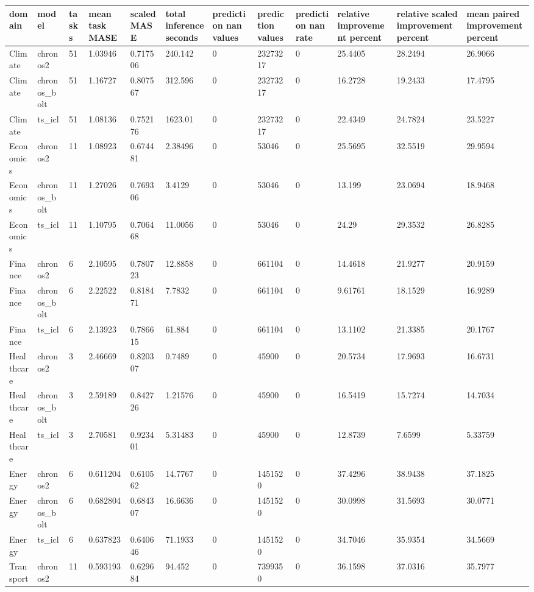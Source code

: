 \begin{tabular}{llllllllllll}
\toprule
domain & model & tasks & mean task MASE & scaled MASE & total inference seconds & prediction nan values & prediction values & prediction nan rate & relative improvement percent & relative scaled improvement percent & mean paired improvement percent \\
\midrule
Climate & chronos2 & 51 & 1.03946 & 0.717506 & 240.142 & 0 & 23273217 & 0 & 25.4405 & 28.2494 & 26.9066 \\
Climate & chronos\_bolt & 51 & 1.16727 & 0.807567 & 312.596 & 0 & 23273217 & 0 & 16.2728 & 19.2433 & 17.4795 \\
Climate & ts\_icl & 51 & 1.08136 & 0.752176 & 1623.01 & 0 & 23273217 & 0 & 22.4349 & 24.7824 & 23.5227 \\
Economics & chronos2 & 11 & 1.08923 & 0.674481 & 2.38496 & 0 & 53046 & 0 & 25.5695 & 32.5519 & 29.9594 \\
Economics & chronos\_bolt & 11 & 1.27026 & 0.769306 & 3.4129 & 0 & 53046 & 0 & 13.199 & 23.0694 & 18.9468 \\
Economics & ts\_icl & 11 & 1.10795 & 0.706468 & 11.0056 & 0 & 53046 & 0 & 24.29 & 29.3532 & 26.8285 \\
Finance & chronos2 & 6 & 2.10595 & 0.780723 & 12.8858 & 0 & 661104 & 0 & 14.4618 & 21.9277 & 20.9159 \\
Finance & chronos\_bolt & 6 & 2.22522 & 0.818471 & 7.7832 & 0 & 661104 & 0 & 9.61761 & 18.1529 & 16.9289 \\
Finance & ts\_icl & 6 & 2.13923 & 0.786615 & 61.884 & 0 & 661104 & 0 & 13.1102 & 21.3385 & 20.1767 \\
Healthcare & chronos2 & 3 & 2.46669 & 0.820307 & 0.7489 & 0 & 45900 & 0 & 20.5734 & 17.9693 & 16.6731 \\
Healthcare & chronos\_bolt & 3 & 2.59189 & 0.842726 & 1.21576 & 0 & 45900 & 0 & 16.5419 & 15.7274 & 14.7034 \\
Healthcare & ts\_icl & 3 & 2.70581 & 0.923401 & 5.31483 & 0 & 45900 & 0 & 12.8739 & 7.6599 & 5.33759 \\
Energy & chronos2 & 6 & 0.611204 & 0.610562 & 14.7767 & 0 & 1451520 & 0 & 37.4296 & 38.9438 & 37.1825 \\
Energy & chronos\_bolt & 6 & 0.682804 & 0.684307 & 16.6636 & 0 & 1451520 & 0 & 30.0998 & 31.5693 & 30.0771 \\
Energy & ts\_icl & 6 & 0.637823 & 0.640646 & 71.1933 & 0 & 1451520 & 0 & 34.7046 & 35.9354 & 34.5669 \\
Transport & chronos2 & 11 & 0.593193 & 0.629684 & 94.452 & 0 & 7399350 & 0 & 36.1598 & 37.0316 & 35.7977 \\

\end{tabular}
